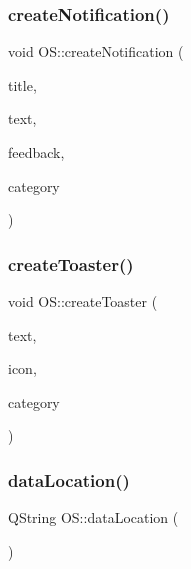 \mbox{\label{classOS_ac21113cbcd347809f657c6a27a0278f6}} 
\subsubsection{\texorpdfstring{createNotification()}{createNotification()}}
{\footnotesize\ttfamily void O\+S\+::create\+Notification (\begin{DoxyParamCaption}\item[{Q\+String}]{title,  }\item[{Q\+String}]{text,  }\item[{Q\+String}]{feedback,  }\item[{Q\+String}]{category }\end{DoxyParamCaption})}

\mbox{\label{classOS_a949a6aa1c2f8cd63d27cd6b8869da8fc}} 
\subsubsection{\texorpdfstring{createToaster()}{createToaster()}}
{\footnotesize\ttfamily void O\+S\+::create\+Toaster (\begin{DoxyParamCaption}\item[{Q\+String}]{text,  }\item[{Q\+String}]{icon,  }\item[{Q\+String}]{category }\end{DoxyParamCaption})}

\mbox{\label{classOS_ae8a69330410d1b615443920baa19cea7}} 
\subsubsection{\texorpdfstring{dataLocation()}{dataLocation()}}
{\footnotesize\ttfamily Q\+String O\+S\+::data\+Location (\begin{DoxyParamCaption}{ }\end{DoxyParamCaption})}

\mbox{\label{classOS_a800e819bbb7aa20945893d138b2a1bb3}} 
